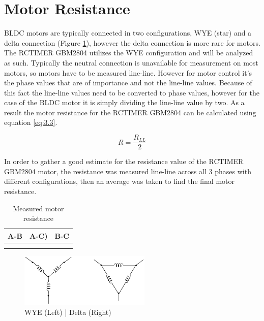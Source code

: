 
\section{Motor Resistance}
BLDC motors are typically connected in two configurations, WYE (star) and a delta connection (Figure \ref{motor_configuration}), however the delta connection is more rare for motors. The RCTIMER GBM2804 utilizes the WYE configuration and will be analyzed as such. Typically the neutral connection is unavailable for measurement on most motors, so motors have to be measured line-line. However for motor control it's the phase values that are of importance and not the line-line values. Because of this fact the line-line values need to be converted to phase values, however for the case of the BLDC motor it is simply dividing the line-line value by two. As a result the motor resistance for the RCTIMER GBM2804 can be calculated using equation \ref{eq:3.3}.

\begin{equation}
R = \frac{R_{LL}}{2}
\end{equation}

In order to gather a good estimate for the resistance value of the RCTIMER GBM2804 motor, the resistance was measured line-line across all 3 phases with different configurations, then an average was taken to find the final motor resistance.

\begin{table}[ht]
\begin{center}
\caption{Measured motor resistance}
\begin{tabular}[c]{|c|c|c|}

\hline
\textbf{A-B} & \textbf{A-C)} & \textbf{B-C}\\

\hline
 &  & \\
 
 \hline
 &  & \\

\hline
\end{tabular}

\label{table3}
\end{center}
\end{table}



\begin{figure}[htb]%
\begin{center}
    \includegraphics[height=1in]{figures/motor_winding.png}

    \caption[Motor Connection Configuration]{WYE (Left) | Delta (Right)}

    \label{motor_configuration}
\end{center}
\end{figure}

